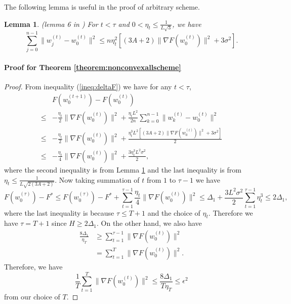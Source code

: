 \documentclass{article} %
\theoremstyle{plain}
\newtheorem{Lemma}[theorem]{Lemma}
\theoremstyle{definition}
\theoremstyle{remark}
\begin{document}
The following lemma is useful in the proof of arbitrary scheme.

\begin{Lemma}(lemma 6 in \citep{nguyen2021unified})
    \label{Lemma:sumofwdiff}
    For $t<\tau$ and $0<\eta_t\leq \frac{1}{L\sqrt{3}}$, we have
    $$\sum_{j=0}^{n-1}\|w^{(t)}_j-w^{(t)}_0\|^2\leq n\eta_t^2[(3A+2)\|\nabla F(w^{(t)}_0)\|^2+3\sigma^2].$$
\end{Lemma}

\paragraph{Proof for Theorem \ref{theorem:nonconvexallscheme}}

\begin{proof}

    From inequality (\ref{ineq:deltaF}) we have for any $t<\tau$,
    \begin{align*}
        & F(w^{(t+1)}_0)-F(w^{(t)}_0) \\
        \leq & -\frac{\eta_t}{2}\|\nabla F(w^{(t)}_0)\|^2+\frac{\eta_t L^2}{2n}\sum_{k=0}^{n-1} \|w^{(t)}_k-w^{(t)}_0\|^2 \\
        \leq & -\frac{\eta_t}{2}\|\nabla F(w^{(t)}_0)\|^2+\frac{\eta_t^3 L^2[(3A+2)\|\nabla F(w^{(t)}_0)\|^2+3\sigma^2]}{2}\\
        \leq & -\frac{\eta_t}{4}\|\nabla F(w^{(t)}_0)\|^2+\frac{3\eta_t^3 L^2\sigma^2}{2},
    \end{align*}
    where the second inequality is from Lemma \ref{Lemma:sumofwdiff} and the last inequality is from $\eta_t\leq \frac{1}{L\sqrt{2(3A+2)}}$. Now taking summation of $t$ from $1$ to $\tau-1$ we have
    $$F(w^{(\tau)}_0)-F^*\leq F(w^{(\tau)}_0)-F^* + \sum_{t=1}^{\tau-1}\frac{\eta_t}{4}\|\nabla F(w^{(t)}_0)\|^2\leq \Delta_1+\frac{3L^2\sigma^2}{2}\sum_{t=1}^{\tau-1}\eta_t^3\leq 2\Delta_1,$$
    where the last inequality is because $\tau\leq T+1$ and the choice of $\eta_t$. Therefore we have $\tau=T+1$ since $H\geq 2\Delta_1$. On the other hand, we also have 
    \begin{align*}
        \frac{8\Delta_1}{\eta_T} & \geq \sum_{t=1}^{\tau-1}\|\nabla F(w^{(t)}_0)\|^2 \\
        & = \sum_{t=1}^T\|\nabla F(w^{(t)}_0)\|^2.
    \end{align*}
    Therefore, we have  
    $$\frac{1}{T}\sum_{t=1}^T\|\nabla F(w^{(t)}_0)\|^2\leq \frac{8\Delta_1}{T\eta_T}\leq \epsilon^2$$
    from our choice of $T$.
\end{proof}
\end{document}
